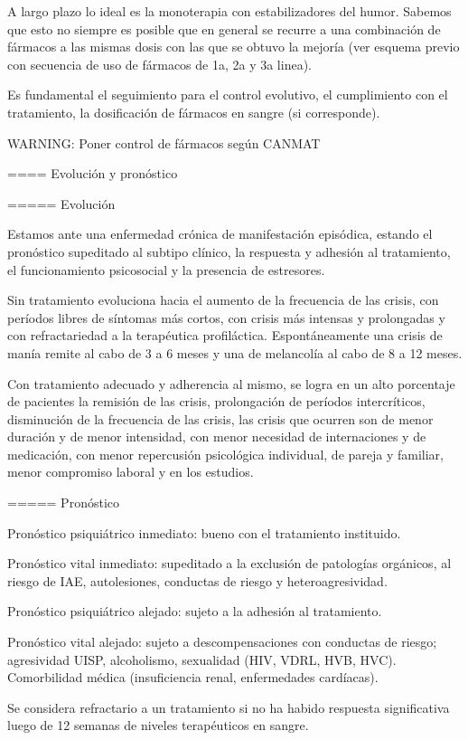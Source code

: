 \documentclass[encares.tex]{subfiles}
\begin{document}
A largo plazo lo ideal es la monoterapia con estabilizadores del humor. Sabemos que esto no siempre es posible que en general se recurre a una combinación de fármacos a las mismas dosis con las que se obtuvo la mejoría (ver esquema previo con secuencia de uso de fármacos de 1a, 2a y 3a linea).

Es fundamental el seguimiento para el control evolutivo, el cumplimiento con el tratamiento, la dosificación de fármacos en sangre (si corresponde).

WARNING: Poner control de fármacos según CANMAT

==== Evolución y pronóstico

===== Evolución

Estamos ante una enfermedad crónica de manifestación episódica, estando el pronóstico supeditado al subtipo clínico, la respuesta y adhesión al tratamiento, el funcionamiento psicosocial y la presencia de estresores.

Sin tratamiento evoluciona hacia el aumento de la frecuencia de las crisis, con períodos libres de síntomas más cortos, con crisis más intensas y prolongadas y con refractariedad a la terapéutica profiláctica. Espontáneamente una crisis de manía remite al cabo de 3 a 6 meses y una de melancolía al cabo de 8 a 12 meses.

Con tratamiento adecuado y adherencia al mismo, se logra en un alto porcentaje de pacientes la remisión de las crisis, prolongación de períodos intercríticos, disminución de la frecuencia de las crisis, las crisis que ocurren son de menor duración y de menor intensidad, con menor necesidad de internaciones y de medicación, con menor repercusión psicológica individual, de pareja y familiar, menor compromiso laboral y en los estudios.

===== Pronóstico

Pronóstico psiquiátrico inmediato: bueno con el tratamiento instituido.

Pronóstico vital inmediato: supeditado a la exclusión de patologías orgánicos, al riesgo de IAE, autolesiones, conductas de riesgo y heteroagresividad.

Pronóstico psiquiátrico alejado: sujeto a la adhesión al tratamiento.

Pronóstico vital alejado: sujeto a descompensaciones con conductas de riesgo; agresividad UISP, alcoholismo, sexualidad (HIV, VDRL, HVB, HVC). Comorbilidad médica (insuficiencia renal, enfermedades cardíacas).

Se considera refractario a un tratamiento si no ha habido respuesta significativa luego de 12 semanas de niveles terapéuticos en sangre.
\end{document}
